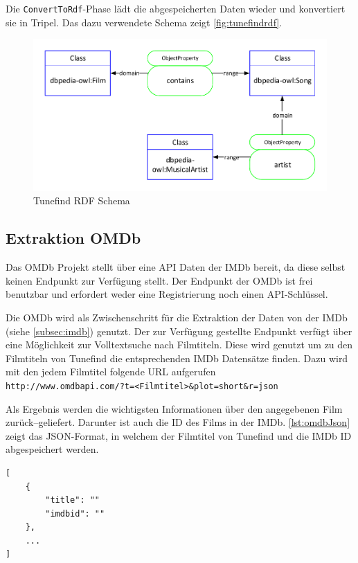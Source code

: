 \documentclass[parskip]{scrartcl}
\begin{document}
Die \texttt{ConvertToRdf}-Phase lädt die abgespeicherten Daten wieder und konvertiert sie in Tripel. Das dazu verwendete Schema zeigt \autoref{fig:tunefindrdf}.

\begin{figure}[H]
    \centering
    \caption{Tunefind RDF Schema}
    \label{fig:tunefindrdf}
    \includegraphics[scale=0.8]{tunefind}
\end{figure}
\subsection{Extraktion OMDb}

Das OMDb Projekt stellt über eine API Daten der IMDb bereit, da diese selbst keinen Endpunkt zur Verfügung stellt. Der Endpunkt der OMDb ist frei benutzbar und erfordert weder eine Registrierung noch einen API-Schlüssel.

Die OMDb wird als Zwischenschritt für die Extraktion der Daten von der IMDb (siehe \ref{subsec:imdb}) genutzt. Der zur Verfügung gestellte Endpunkt verfügt über eine Möglichkeit zur Volltextsuche nach Filmtiteln. Diese wird genutzt um zu den Filmtiteln von Tunefind die entsprechenden IMDb Datensätze finden. Dazu wird mit den jedem Filmtitel folgende URL aufgerufen\\
\texttt{http://www.omdbapi.com/?t=<Filmtitel>\&plot=short\&r=json}

Als Ergebnis werden die wichtigsten Informationen über den angegebenen Film zurück--geliefert. Darunter ist auch die ID des Films in der IMDb. \autoref{lst:omdbJson} zeigt das JSON-Format, in welchem der Filmtitel von Tunefind und die IMDb ID abgespeichert werden.

\begin{lstlisting}[caption={OMDb JSON-Format}, label={lst:omdbJson}]
[  
    {  
        "title": ""
        "imdbid": ""
    },
    ...
]
\end{lstlisting}
\end{document}

